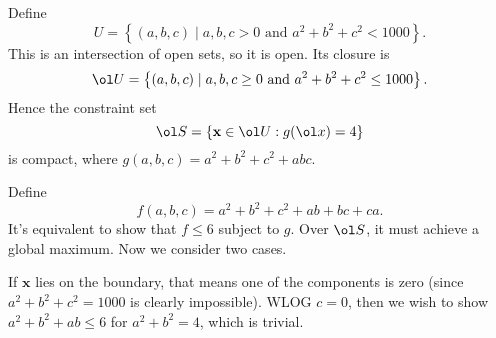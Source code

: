\documentclass[11pt]{scrartcl}
\begin{document}
Define \[ U = \left\{ (a,b,c) \mid a,b,c > 0
  \text{ and } a^2+b^2+c^2 < 1000 \right\}. \]
This is an intersection of open sets, so it is open.
Its closure is
\[ \ol U = \left\{ (a,b,c) \mid a,b,c \ge 0
\text{ and } a^2+b^2+c^2 \le 1000 \right\}. \]
Hence the constraint set
\[ \ol S = \left\{ \mathbf x \in \ol U : g(\ol x) = 4 \right\} \]
is compact, where $g(a,b,c) = a^2+b^2+c^2+abc$.

Define \[ f(a,b,c) = a^2+b^2+c^2+ab+bc+ca. \]
It's equivalent to show that $f \le 6$ subject to $g$.
Over $\ol S$, it must achieve a global maximum.
Now we consider two cases.

If $\mathbf x$ lies on the boundary,
that means one of the components is zero
(since $a^2+b^2+c^2=1000$ is clearly impossible).
WLOG $c=0$, then we wish to show $a^2+b^2+ab \le 6$
for $a^2+b^2=4$, which is trivial.
\end{document}
